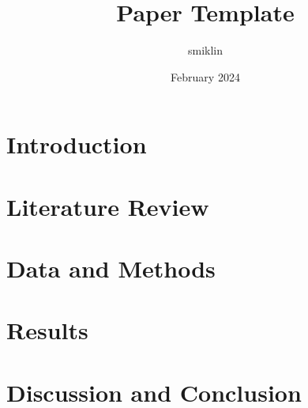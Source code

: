 \documentclass{article}
\title{Paper Template}
\author{smiklin }
\date{February 2024}
\begin{document}
\maketitle

\section{Introduction}
\section{Literature Review}
\section{Data and Methods}
\section{Results}
\section{Discussion and Conclusion}
\end{document}
